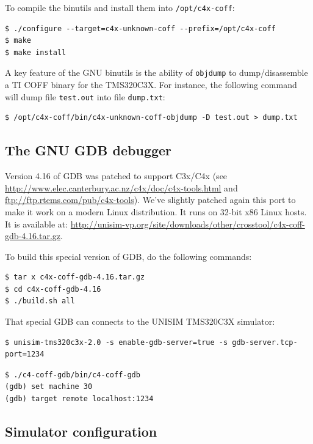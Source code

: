 To compile the binutils and install them into \texttt{/opt/c4x-coff}:

\begin{verbatim}
$ ./configure --target=c4x-unknown-coff --prefix=/opt/c4x-coff
$ make
$ make install
\end{verbatim}

A key feature of the GNU binutils is the ability of \texttt{objdump} to dump/disassemble a TI COFF binary for the TMS320C3X.
For instance, the following command will dump file \texttt{test.out} into file \texttt{dump.txt}:

\begin{verbatim}
$ /opt/c4x-coff/bin/c4x-unknown-coff-objdump -D test.out > dump.txt
\end{verbatim}

\subsection{The GNU GDB debugger}

Version 4.16 of GDB was patched to support C3x/C4x (see \url{http://www.elec.canterbury.ac.nz/c4x/doc/c4x-tools.html} and \url{ftp://ftp.rtems.com/pub/c4x-tools}).
We've slightly patched again this port to make it work on a modern Linux distribution.
It runs on 32-bit x86 Linux hosts.
It is available at: \url{http://unisim-vp.org/site/downloads/other/crosstool/c4x-coff-gdb-4.16.tar.gz}.

To build this special version of GDB, do the following commands:
\begin{verbatim}
$ tar x c4x-coff-gdb-4.16.tar.gz
$ cd c4x-coff-gdb-4.16
$ ./build.sh all
\end{verbatim}

That special GDB can connects to the UNISIM TMS320C3X simulator:

\begin{verbatim}
$ unisim-tms320c3x-2.0 -s enable-gdb-server=true -s gdb-server.tcp-port=1234
\end{verbatim}

\begin{verbatim}
$ ./c4-coff-gdb/bin/c4-coff-gdb 
(gdb) set machine 30
(gdb) target remote localhost:1234
\end{verbatim}

\subsection{Simulator configuration}
\label{tms320c3x_configuration}

